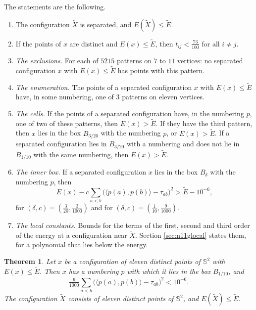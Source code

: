 \documentclass[reqno,a4paper,11pt]{amsart}
\numberwithin{equation}{section}
\newtheorem{theorem}{Theorem}[section]
\newcommand{\Sph}{\mathbb{S}}
\newcommand{\factNrgEnumFinal}{3}
\newcommand{\factNrgExcl}{5215}
\begin{document}
The statements are the following.
\begin{enumerate}
    \item[(G1)] The configuration $\tilde X$ is separated, and $E(\tilde X) \leq \tilde E$.
    \item[(G2)] If the points of $x$ are distinct and $E(x) \leq \tilde E$, then $t_{ij} < \tfrac{73}{100}$ for all $i \neq j$.
    \item[(G3)] \emph{The exclusions.} For each of $\factNrgExcl$ patterns on $7$ to $11$ vertices: no separated configuration $x$ with $E(x) \leq \tilde E$ has points with this pattern.
    \item[(G4)] \emph{The enumeration.} The points of a separated configuration $x$ with $E(x) \leq \tilde E$ have, in some numbering, one of $\factNrgEnumFinal$ patterns on eleven vertices.
    \item[(G5)] \emph{The cells.} If the points of a separated configuration have, in the numbering $p$, one of two of these patterns, then $E(x) > \tilde E$. If they have the third pattern, then $x$ lies in the box $B_{3/20}$ with the numbering $p$, or $E(x) > \tilde E$. If a separated configuration lies in $B_{3/20}$ with a numbering and does not lie in $B_{1/10}$ with the same numbering, then $E(x) > \tilde E$.
    \item[(G6)] \emph{The inner box.} If a separated configuration $x$ lies in the box $B_\delta$ with the numbering $p$, then
    \begin{equation}\label{eq:n11pen}
    E(x) - c \sum_{a<b} \bigl( \langle p(a), p(b) \rangle - \tau_{ab} \bigr)^2 > \tilde E - 10^{-6},
    \end{equation}
    for $(\delta, c) = (\tfrac{3}{20}, \tfrac{3}{1000})$ and for $(\delta, c) = (\tfrac{1}{10}, \tfrac{9}{1000})$.
    \item[(G7)] \emph{The local constants.} Bounds for the terms of the first, second and third order of the energy at a configuration near $\tilde X$. Section \ref{sec:n11glocal} states them, for a polynomial that lies below the energy.
\end{enumerate}

\begin{theorem}\label{thm:routeg}
Let $x$ be a configuration of eleven distinct points of $\Sph^2$ with $E(x) \leq \tilde E$. Then $x$ has a numbering $p$ with which it lies in the box $B_{1/10}$, and
$$
\tfrac{9}{1000} \sum_{a<b} \bigl( \langle p(a), p(b) \rangle - \tau_{ab} \bigr)^2 < 10^{-6} .
$$
The configuration $\tilde X$ consists of eleven distinct points of $\Sph^2$, and $E(\tilde X) \leq \tilde E$.
\end{theorem}
\end{document}
